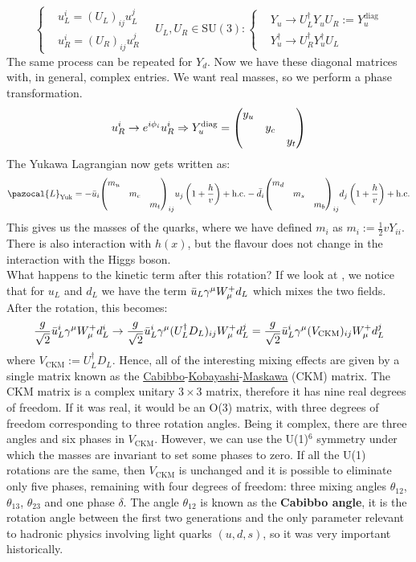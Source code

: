 \documentclass[../main.tex]{subfiles}
\begin{document}
\[
\left\{
\begin{aligned}
&u_L^i=(U_L)_{ij}u_L^j\\
&u_R^i=(U_R)_{ij}u_R^j
\end{aligned}
\right.
\quad 
U_L,U_R\in\text{SU}(3):
\left\{
\begin{aligned}
&Y_u\to U_L^\dagger Y_uU_R:=Y_u^{\text{diag}}\\
&Y_u^\dagger\to U_R^\dagger Y_u^\dagger U_L
\end{aligned}
\right.
\]
The same process can be repeated for $Y_d$. Now we have these diagonal matrices with, in general, complex entries. We want real masses, so we perform a phase transformation.
\[
u_R^i\to e^{i\phi_i}u_R^i\Rightarrow Y_u^{\text{diag}}=\mqty(\dmat{y_u,y_c,y_t})
\]
The Yukawa Lagrangian now gets written as:
\[
\pazocal{L}_{\text{Yuk}}=-\Bar{u}_i\mqty(\dmat{m_u,m_c,m_t})_{ij}u_j\left(1+\frac{h}{v}\right)+\text{h.c.}-\Bar{d}_i\mqty(\dmat{m_d,m_s,m_b})_{ij}d_j\left(1+\frac{h}{v}\right)+\text{h.c.}
\]
This gives us the masses of the quarks, where we have defined $m_i$ as $m_i:=\frac{1}{2}vY_{ii}$. There is also interaction with $h(x)$, but the flavour does not change in the interaction with the Higgs boson.\\
What happens to the kinetic term after this rotation? If we look at , we notice that for $u_L$ and $d_L$ we have the term $\Bar{u}_L\gamma^\mu W_\mu^+d_L$ which mixes the two fields. After the rotation, this becomes:
\[
\frac{g}{\sqrt{2}}\Bar{u}_L^i\gamma^\mu W_\mu^+d_L^i\to\frac{g}{\sqrt{2}}\Bar{u}_L^i\gamma^\mu(U_L^\dagger D_L)_{ij}W_\mu^+d_L^j=\frac{g}{\sqrt{2}}\Bar{u}_L^i\gamma^\mu(V_{\text{CKM}})_{ij}W_\mu^+d_L^j
\]
where $V_{\text{CKM}}:=U_L^\dagger D_L$. Hence, all of the interesting mixing effects are given by a single matrix known as the \href{https://en.wikipedia.org/wiki/Nicola_Cabibbo}{Cabibbo}-\href{https://en.wikipedia.org/wiki/Makoto_Kobayashi_(physicist)}{Kobayashi}-\href{https://en.wikipedia.org/wiki/Toshihide_Maskawa}{Maskawa} (CKM) matrix. The CKM matrix is a complex unitary $3\times3$ matrix, therefore it has nine real degrees of freedom. If it was real, it would be an O(3) matrix, with three degrees of freedom corresponding to three rotation angles. Being it complex, there are three angles and six phases in $V_{\text{CKM}}$. However, we can use the U(1)$^6$ symmetry under which the masses are invariant to set some phases to zero. If all the U(1) rotations are the same, then $V_{\text{CKM}}$ is unchanged and it is possible to eliminate only five phases, remaining with four degrees of freedom: three mixing angles $\theta_{12}$, $\theta_{13}$, $\theta_{23}$ and one phase $\delta$. The angle $\theta_{12}$ is known as the \textbf{Cabibbo angle}, it is the rotation angle between the first two generations and the only parameter relevant to hadronic physics involving light quarks $(u,d,s)$, so it was very important historically.\\
\end{document}
